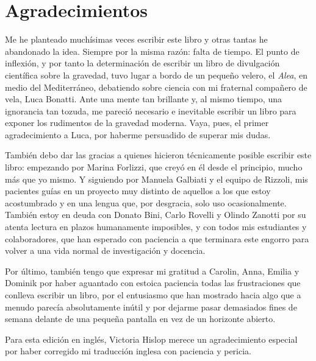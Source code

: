 \chapter*{Agradecimientos}\label{acknowledgements}

Me he planteado muchísimas veces escribir este libro y otras tantas he abandonado la idea. Siempre por la misma razón: falta de tiempo. El punto de inflexión, y por tanto la determinación de escribir un libro de divulgación científica sobre la gravedad, tuvo lugar a bordo de un pequeño velero, el \emph{Alea}, en medio del Mediterráneo, debatiendo sobre ciencia con mi fraternal compañero de vela, Luca Bonatti. Ante una mente tan brillante y, al mismo tiempo, una ignorancia tan tozuda, me pareció necesario e inevitable escribir un libro para exponer los rudimentos de la gravedad moderna. Vaya, pues, el primer agradecimiento a Luca, por haberme persuadido de superar mis dudas.

También debo dar las gracias a quienes hicieron técnicamente posible escribir este libro: empezando por Marina Forlizzi, que creyó en él desde el principio, mucho más que yo mismo. Y siguiendo por Manuela Galbiati y el equipo de Rizzoli, mis pacientes guías en un proyecto muy distinto de aquellos a los que estoy acostumbrado y en una lengua que, por desgracia, solo uso ocasionalmente. También estoy en deuda con Donato Bini, Carlo Rovelli y Olindo Zanotti por su atenta lectura en plazos humanamente imposibles, y con todos mis estudiantes y colaboradores, que han esperado con paciencia a que terminara este engorro para volver a una vida normal de investigación y docencia.

Por último, también tengo que expresar mi gratitud a Carolin, Anna, Emilia y Dominik por haber aguantado con estoica paciencia todas las frustraciones que conlleva escribir un libro, por el entusiasmo que han mostrado hacia algo que a menudo parecía absolutamente inútil y por dejarme pasar demasiados fines de semana delante de una pequeña pantalla en vez de un horizonte abierto.

Para esta edición en inglés, Victoria Hislop merece un agradecimiento especial por haber corregido mi traducción inglesa con paciencia y pericia.
